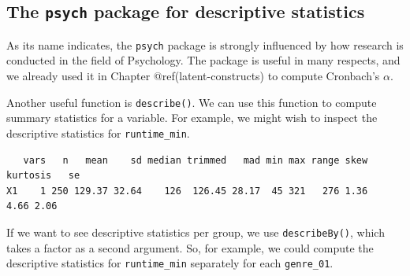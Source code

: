 \documentclass[
  letterpaper,
]{krantz}
\makeatletter
\newenvironment{Shaded}{\begin{snugshade}}{\end{snugshade}}
\newcommand{\CommentTok}[1]{\textcolor[rgb]{0.37,0.37,0.37}{#1}}
\newcommand{\DecValTok}[1]{\textcolor[rgb]{0.68,0.00,0.00}{#1}}
\newcommand{\FunctionTok}[1]{\textcolor[rgb]{0.28,0.35,0.67}{#1}}
\newcommand{\NormalTok}[1]{\textcolor[rgb]{0.00,0.23,0.31}{#1}}
\newcommand{\OtherTok}[1]{\textcolor[rgb]{0.00,0.23,0.31}{#1}}
\newcommand{\SpecialCharTok}[1]{\textcolor[rgb]{0.37,0.37,0.37}{#1}}
\newenvironment{kframe}{%
\medskip{}
\setlength{\fboxsep}{.8em}
 \def\at@end@of@kframe{}%
 \ifinner\ifhmode%
  \def\at@end@of@kframe{\end{minipage}}%
  \begin{minipage}{\columnwidth}%
 \fi\fi%
 \def\FrameCommand##1{\hskip\@totalleftmargin \hskip-\fboxsep
 \colorbox{shadecolor}{##1}\hskip-\fboxsep
     \hskip-\linewidth \hskip-\@totalleftmargin \hskip\columnwidth}%
 \MakeFramed {\advance\hsize-\width
   \@totalleftmargin\z@ \linewidth\hsize
   \@setminipage}}%
 {\par\unskip\endMakeFramed%
 \at@end@of@kframe}
\renewenvironment{Shaded}{\begin{kframe}}{\end{kframe}}
\makeatother
\begin{document}
\subsection{\texorpdfstring{The \texttt{psych} package for descriptive
statistics}{The psych package for descriptive statistics}}\label{sec-psych-package}

As its name indicates, the \texttt{psych} package is strongly influenced
by how research is conducted in the field of Psychology. The package is
useful in many respects, and we already used it in Chapter
@ref(latent-constructs) to compute Cronbach's \(\alpha\).

Another useful function is \texttt{describe()}. We can use this function
to compute summary statistics for a variable. For example, we might wish
to inspect the descriptive statistics for \texttt{runtime\_min}.

\begin{Shaded}
\end{Shaded}

\begin{verbatim}
   vars   n   mean    sd median trimmed   mad min max range skew kurtosis   se
X1    1 250 129.37 32.64    126  126.45 28.17  45 321   276 1.36     4.66 2.06
\end{verbatim}

If we want to see descriptive statistics per group, we use
\texttt{describeBy()}, which takes a factor as a second argument. So,
for example, we could compute the descriptive statistics for
\texttt{runtime\_min} separately for each \texttt{genre\_01}.

\begin{Shaded}
\end{Shaded}
\end{document}
